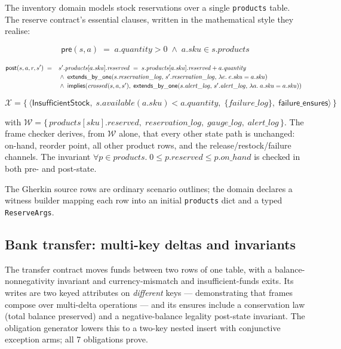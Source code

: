 \documentclass[11pt,a4paper]{article}
\begin{document}
The inventory domain models stock reservations over a single
\texttt{products} table.  The reserve contract's essential clauses,
written in the mathematical style they realise:

\[
\mathsf{pre}(s, a) \;=\; a.\mathit{quantity} > 0 \;\wedge\; a.\mathit{sku} \in s.\mathit{products}
\]

\[
\mathsf{post}(s, a, r, s') \;=\;
\begin{array}[t]{l}
s'.\mathit{products}[a.\mathit{sku}].\mathit{reserved}
  \;=\; s.\mathit{products}[a.\mathit{sku}].\mathit{reserved} + a.\mathit{quantity} \\[2pt]
{}\wedge\; \mathsf{extends\_by\_one}(s.\mathit{reservation\_log},\, s'.\mathit{reservation\_log},\,
      \lambda e.\; e.\mathit{sku} = a.\mathit{sku}) \\[2pt]
{}\wedge\; \mathsf{implies}(\mathit{crossed}(s,a,s'),\;
      \mathsf{extends\_by\_one}(s.\mathit{alert\_log},\, s'.\mathit{alert\_log},\,
        \lambda a.\; a.\mathit{sku} = a.\mathit{sku}))
\end{array}
\]

\[
\mathcal{X} = \bigl\{\,
\langle \mathsf{InsufficientStock},\; s.\mathit{available}(a.\mathit{sku}) < a.\mathit{quantity},\;
       \{\mathit{failure\_log}\},\; \mathsf{failure\_ensures} \rangle \,\bigr\}
\]

with $\mathcal{W} = \{\,\mathit{products}[sku].\mathit{reserved},\; \mathit{reservation\_log},\; \mathit{gauge\_log},\; \mathit{alert\_log}\,\}$.
The frame checker derives, from $\mathcal{W}$ alone, that every other
state path is unchanged: on-hand, reorder point, all other product
rows, and the release/restock/failure channels.  The invariant
$\forall p \in \mathit{products}.\; 0 \leq p.\mathit{reserved} \leq
p.\mathit{on\_hand}$ is checked in both pre- and post-state.

The Gherkin source rows are ordinary scenario outlines; the domain
declares a witness builder mapping each row into an initial
\texttt{products} dict and a typed \texttt{ReserveArgs}.

\subsection{Bank transfer: multi-key deltas and invariants}

The transfer contract moves funds between two rows of one table, with
a balance-nonnegativity invariant and currency-mismatch and
insufficient-funds exits.  Its writes are two keyed attributes on
\emph{different} keys --- demonstrating that frames compose over
multi-delta operations --- and its ensures include a conservation law
(total balance preserved) and a negative-balance legality post-state
invariant.  The obligation generator lowers this to a two-key nested
insert with conjunctive exception arms; all 7 obligations prove.
\end{document}
